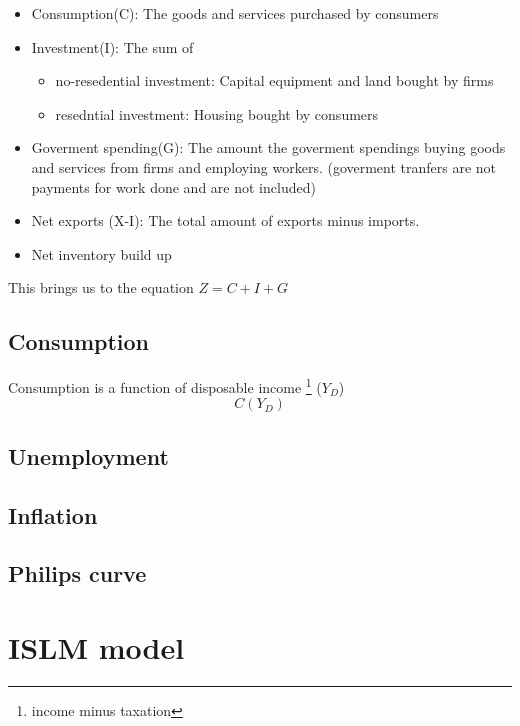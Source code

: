 \documentclass{tufte-book}
\providecommand{\tightlist}{%
  \setlength{\itemsep}{0pt}\setlength{\parskip}{0pt}}
\begin{document}
\begin{itemize}
\tightlist
\item
  Consumption(C): The goods and services purchased by consumers
\item
  Investment(I): The sum of

  \begin{itemize}
  \tightlist
  \item
    no-resedential investment: Capital equipment and land bought by
    firms
  \item
    resedntial investment: Housing bought by consumers
  \end{itemize}
\item
  Goverment spending(G): The amount the goverment spendings buying goods
  and services from firms and employing workers. (goverment tranfers are
  not payments for work done and are not included)
\item
  Net exports (X-I): The total amount of exports minus imports.
\item
  Net inventory build up
\end{itemize}

This brings us to the equation \(Z = C + I + G\)

\hypertarget{consumption}{%
\subsection{Consumption}\label{consumption}}

Consumption is a function of disposable income \footnote{income minus
  taxation} (\(Y_D\)) \[ C(Y_D) \]

\hypertarget{unemployment}{%
\subsection{Unemployment}\label{unemployment}}

\hypertarget{inflation}{%
\subsection{Inflation}\label{inflation}}

\hypertarget{philips-curve}{%
\subsection{Philips curve}\label{philips-curve}}\hypertarget{islm-model}{%
\section{ISLM model}\label{islm-model}}
\end{document}
